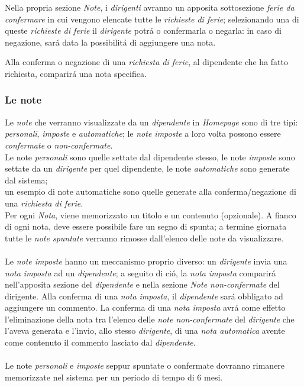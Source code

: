 \documentclass[paper=a4, fontsize=11pt]{scrartcl} %
\numberwithin{equation}{section} %
\numberwithin{figure}{section} %
\numberwithin{table}{section} %
\begin{document}
Nella propria sezione \textit{Note}, i \textit{dirigenti} avranno un apposita sottosezione \textit{ferie da confermare}
in cui vengono elencate tutte le \textit{richieste di ferie}; selezionando una di queste \textit{richieste di ferie}
il \textit{dirigente} potr\'a o confermarla o negarla: in caso di negazione, sar\'a data la possibilit\'a di aggiungere
una nota.

Alla conferma o negazione di una \textit{richiesta di ferie}, al dipendente che ha fatto richiesta, comparir\'a una
nota specifica.


\subsubsection{Le note}

Le \textit{note} che verranno visualizzate da un \textit{dipendente} in \textit{Homepage} sono di tre tipi:
\textit{personali}, \textit{imposte} e \textit{automatiche}; le \textit{note imposte} a loro volta possono
essere \textit{confermate} o \textit{non-confermate}.\\
Le note \textit{personali} sono quelle settate dal dipendente stesso,
le note \textit{imposte} sono settate da un \textit{dirigente} per quel dipendente,
le note \textit{automatiche} sono generate dal sistema;\\
un esempio di note automatiche sono quelle generate alla conferma/negazione di una \textit{richiesta di ferie}.\\
Per ogni \textit{Nota}, viene memorizzato un titolo e un contenuto (opzionale).
A fianco di ogni nota, deve essere possibile fare un segno di spunta; a termine giornata tutte le \textit{note spuntate}
verranno rimosse dall'elenco delle note da visualizzare.\\\\
Le \textit{note imposte} hanno un meccanismo proprio diverso:
un \textit{dirigente} invia una \textit{nota imposta} ad un \textit{dipendente}; a seguito di ci\'o, la \textit{nota imposta}
comparir\'a nell'apposita sezione del \textit{dipendente} e nella sezione \textit{Note non-confermate} del dirigente.
Alla conferma di una \textit{nota imposta}, il \textit{dipendente} sar\'a obbligato ad aggiungere un commento.
La conferma di una \textit{nota imposta} avr\'a come effetto l'eliminazione della nota tra l'elenco delle \textit{note non-confermate}
del \textit{dirigente} che l'aveva generata e l'invio, allo stesso \textit{dirigente}, di una \textit{nota automatica}
avente come contenuto il commento lasciato dal \textit{dipendente}.\\\\
Le note \textit{personali} e \textit{imposte} seppur spuntate o confermate dovranno rimanere memorizzate nel sistema per un periodo
di tempo di 6 mesi.
\end{document}
